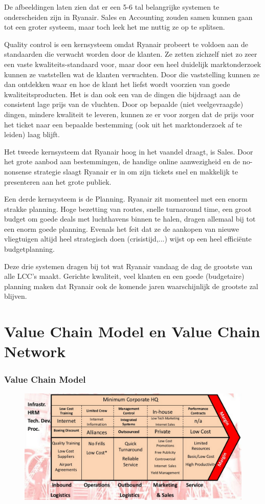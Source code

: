\documentclass{article}
\begin{document}
\newpage

De afbeeldingen laten zien dat er een 5-6 tal belangrijke systemen te onderscheiden zijn in Ryanair. Sales en Accounting zouden samen kunnen gaan tot een groter systeem, maar toch leek het me nuttig ze op te splitsen.

Quality control is een kernsysteem omdat Ryanair probeert te voldoen aan de standaarden die verwacht worden door de klanten. Ze zetten zichzelf niet zo zeer een vaste kwaliteits-standaard voor, maar door een heel duidelijk marktonderzoek kunnen ze vaststellen wat de klanten verwachten. Door die vaststelling kunnen ze dan ontdekken waar en hoe de klant het liefst wordt voorzien van goede kwaliteitsproducten. Het is dan ook een van de dingen die bijdraagt aan de consistent lage prijs van de vluchten. Door op bepaalde (niet veelgevraagde) dingen, mindere kwaliteit te leveren, kunnen ze er voor zorgen dat de prijs voor het ticket naar een bepaalde bestemming (ook uit het marktonderzoek af te leiden) laag blijft.

Het tweede kernsysteem dat Ryanair hoog in het vaandel draagt, is Sales. Door het grote aanbod aan bestemmingen, de handige online aanwezigheid en de no-nonsense strategie slaagt Ryanair er in om zijn tickets snel en makkelijk te presenteren aan het grote publiek.

Een derde kernsysteem is de Planning. Ryanair zit momenteel met een enorm strakke planning. Hoge bezetting van routes, snelle turnaround time, een groot budget om goede deals met luchthavens binnen te halen, dragen allemaal bij tot een enorm goede planning. Evenals het feit dat ze de aankopen van nieuwe vliegtuigen altijd heel strategisch doen (crisistijd,...) wijst op een heel effici\"ente budgetplanning.

Deze drie systemen dragen bij tot wat Ryanair vandaag de dag de grootste van alle LCC's maakt. Gerichte kwaliteit, veel klanten en een goede (budgetaire) planning maken dat Ryanair ook de komende jaren waarschijnlijk de grootste zal blijven.

\part{Value Chain Model en Value Chain Network}
\setcounter{section}{0}
\section{Value Chain Model}
\begin{figure}[h]
\centering
\includegraphics[scale=0.344]{image4}
\end{figure}
\end{document}
